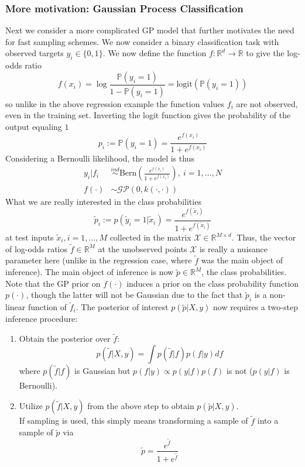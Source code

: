 \documentclass[12pt]{article}
\newcommand{\R}{\mathcal{R}}
\newcommand{\Prob}{\mathbb{P}}
\def\R{\mathbb{R}}
\begin{document}
\subsubsection{More motivation: Gaussian Process Classification}
Next we consider a more complicated GP model that further motivates the need for fast sampling schemes. We now consider a binary classification task with observed targets 
$y_i \in \{0, 1\}$. We now define the function $f: \R^d \to \R$ to give the log-odds ratio
\[f(x_i) = \log \frac{\Prob(y_i = 1)}{1 - \Prob(y_i = 1)} = \text{logit}(\Prob(y_i = 1))\]
so unlike in the above regression example the function values $f_i$ are not observed, even in the training set. Inverting the logit function gives the probability of the output equaling $1$
\[p_i := \Prob(y_i = 1) = \frac{e^{f(x_i)}}{1 + e^{f(x_i)}}\]
Considering a Bernoulli likelihood, the model is thus
\begin{align*}
y_i|f_i &\overset{ind}{\sim} \text{Bern}\left(\frac{e^{f(x_i)}}{1 + e^{f(x_i)}}\right), \ i = 1, \dots, N \\
f(\cdot) &\sim \mathcal{GP}(0, k(\cdot, \cdot))
\end{align*}
What we are really interested in the class probabilities 
\[\tilde{p}_i := p(\tilde{y}_i = 1|\tilde{x}_i) = \frac{e^{f(\tilde{x}_i)}}{1 + e^{f(\tilde{x}_i)}}\]
at test inputs $\tilde{x}_i, i = 1, \dots, M$ collected in the matrix $\mathcal{X} \in \R^{M \times d}$. Thus, the vector of log-odds ratios $\tilde{f} \in \R^M$ at the unobserved 
points $\mathcal{X}$ is really a nuisance parameter here (unlike in the regression case, where $\tilde{f}$ was the main object of inference). The main object of inference is 
now $\tilde{p} \in \R^M$, the class probabilities. Note that the GP prior on $f(\cdot)$ induces 
a prior on the class probability function $p(\cdot)$, though the latter will not be Gaussian due to the fact that $\tilde{p}_i$ is a non-linear function of $\tilde{f}_i$. The posterior of interest $p(\tilde{p}|X, y)$ now requires a two-step inference procedure:
\begin{enumerate}
\item Obtain the posterior over $\tilde{f}$:
\[p(\tilde{f}|X, y) = \int p(\tilde{f}|f)p(f|y) df\]
where $p(\tilde{f}|f)$ is Gaussian but $p(f|y) \propto p(y|f)p(f)$ is not ($p(y|f)$ is Bernoulli). 
\item Utilize $p(\tilde{f}|X, y)$ from the above step to obtain $p(\tilde{p}|X, y)$. \\[.2cm]
If sampling is used, this simply means transforming a sample of $\tilde{f}$ into a sample of $\tilde{p}$ via
\[\tilde{p} = \frac{e^{\tilde{f}}}{1 + e^{\tilde{f}}}\]
\end{enumerate}
\end{document}
